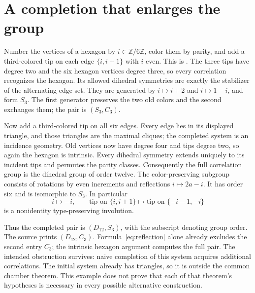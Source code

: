 \section{A completion that enlarges the group}
\label{sec:hexagon}
Number the vertices of a hexagon by $i\in\mathbb Z/6\mathbb Z$, color them
by parity, and add a third-colored tip on each edge $\{i,i+1\}$ with $i$
even. This is \cite[Example 5.1]{DMV}. The three tips have degree two and
the six hexagon vertices degree three, so every correlation recognizes the
hexagon. Its allowed dihedral symmetries are exactly the stabilizer of the
alternating edge set. They are generated by $i\mapsto i+2$ and
$i\mapsto1-i$, and form $S_3$. The first generator preserves the two old
colors and the second exchanges them; the pair is $(S_3,C_3)$.

Now add a third-colored tip on all six edges. Every edge lies in its displayed
triangle, and those triangles are the maximal cliques; the completed system
is an incidence geometry. Old vertices now have degree four and tips degree
two, so again the hexagon is intrinsic. Every dihedral symmetry extends
uniquely to its incident tips and permutes the parity classes. Consequently
the full correlation group is the dihedral group of order twelve. The
color-preserving subgroup consists of rotations by even increments and
reflections $i\mapsto2a-i$. It has order six and is isomorphic to $S_3$.
In particular
\begin{equation}\label{eq:reflection}
 i\longmapsto-i,\qquad
 \text{tip on }\{i,i+1\}\longmapsto
 \text{tip on }\{-i-1,-i\}
\end{equation}
is a nonidentity type-preserving involution.

Thus the completed pair is $(D_{12},S_3)$, with the subscript denoting group
order. The source prints $(D_{12},C_3)$. Formula~\eqref{eq:reflection}
alone already excludes the second entry $C_3$; the intrinsic hexagon argument
computes the full pair. The intended obstruction survives: naive completion
of this system acquires additional correlations. The initial system already
has triangles, so it is outside the common chamber theorem. This example
does not prove that each of that theorem's hypotheses is necessary in every
possible alternative construction.

